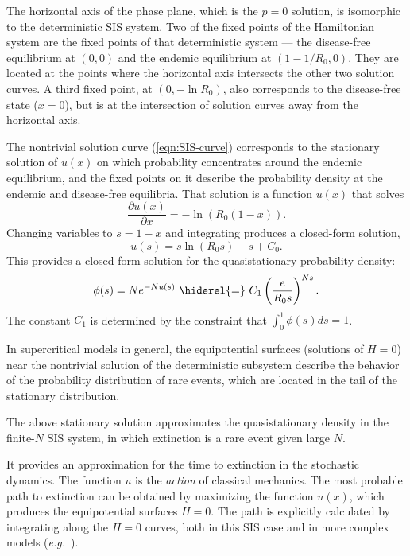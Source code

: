 \documentclass[review]{elsarticle}
\begin{document}
The horizontal axis of the phase plane, which is the $p=0$ solution,
is isomorphic to
the deterministic SIS system.  Two of the fixed points of the Hamiltonian
system are the fixed points of that deterministic system --- the
disease-free equilibrium at $(0,0)$
and the endemic equilibrium at $(1-1/R_0,0)$.  They are located at the
points where the horizontal axis intersects the other two solution curves.
A third fixed point, at 
$(0,-\ln R_0)$, also corresponds to the disease-free state ($x=0$), but is at the
intersection of solution curves away from the horizontal axis. 

The nontrivial solution curve (\ref{eqn:SIS-curve})
corresponds to the stationary
solution of $u(x)$ on which probability concentrates around the endemic equilibrium,
and the fixed points on it describe
the probability density at the endemic and disease-free equilibria.
That solution is a function $u(x)$ that solves
\begin{dmath*}
\frac{\partial u(x)}{\partial x} = -\ln(R_0(1-x)).
\end{dmath*}
Changing variables to $s=1-x$ and integrating
produces a closed-form solution,
\begin{dmath*}
u(s) = s\ln(R_0 s) - s + C_0.
\end{dmath*}
This provides a closed-form solution for the quasistationary probability
density:
\begin{dmath}[label=eq:approx]
\phi(s) = N e^{-Nu(s)}\ \hiderel{=}\ C_1\left(\frac{e}{R_0 s}\right)^{Ns}.
\end{dmath}
The constant $C_1$ is determined by the constraint that
$\int_0^1 \phi(s) ds = 1$.

In supercritical models in general, the equipotential surfaces
(solutions of $H=0$)
near the nontrivial solution of the deterministic
subsystem 
describe the behavior of the probability distribution of rare
events, which are located in the tail of the stationary distribution.

The above stationary solution approximates the quasistationary density
in the finite-$N$ SIS system,
in which extinction is a rare event given large $N$.

It provides an approximation for the time to extinction in the stochastic dynamics.
The function $u$ is the {\it action} of classical mechanics.
The most probable path to extinction can be obtained by maximizing the
function $u(x)$, which produces the equipotential surfaces $H=0$.
The path is explicitly calculated by integrating along the $H=0$ curves,
both in this SIS case and in more complex models 
(\emph{e.g.}\ \cite{schwartz_converging_2011}).
\end{document}
